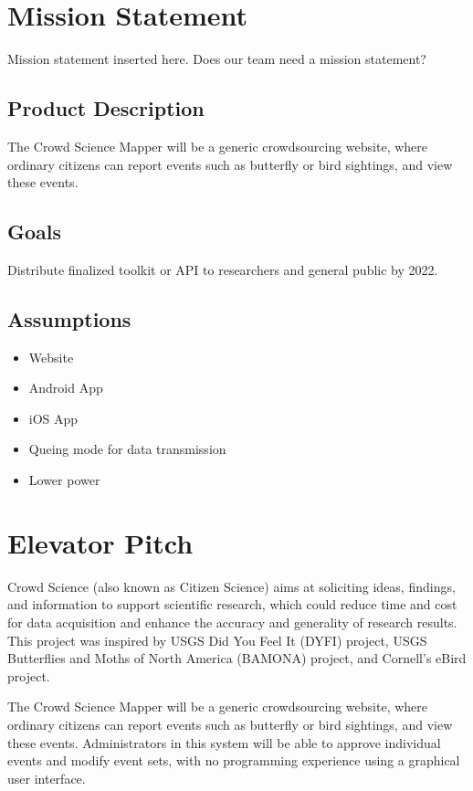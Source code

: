 
\section{Mission Statement}
Mission statement inserted here.   Does our team need a mission statement?
\subsection{Product Description}
The Crowd Science Mapper will be a generic crowdsourcing website, where ordinary citizens can report events such as butterfly or bird sightings, and view these events. 
\subsection{Goals}
Distribute finalized toolkit or API to researchers and general public by 2022.
\subsection{Assumptions}
\begin{itemize}
\item Website
\item Android App
\item iOS App
\item Queing mode for data transmission
\item Lower power
\end{itemize}

\section{Elevator Pitch}
Crowd Science (also known as Citizen Science) aims at soliciting ideas, findings, and information to support scientific research, which could reduce time and cost for data acquisition and enhance the accuracy and generality of research results. This project was inspired by USGS Did You Feel It (DYFI) project, USGS Butterflies and Moths of North America (BAMONA) project, and Cornell’s eBird project.

The Crowd Science Mapper will be a generic crowdsourcing website, where ordinary citizens can report events such as butterfly or bird sightings, and view these events. Administrators in this system will be able to approve individual events and modify event sets, with no programming experience using a graphical user interface.
